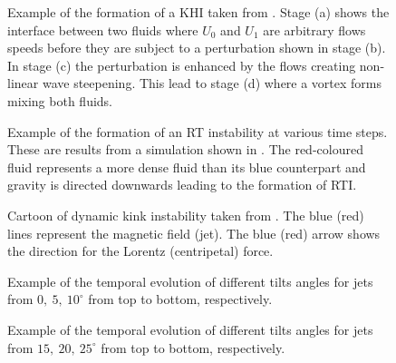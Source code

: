 \documentclass[12pt]{ociamthesis}
\begin{document}
\begin{figure}
\captionsetup[subfigure]{labelformat=empty}
\centering
{}
\caption{Example of the formation of a KHI taken from \cite{Barbulescu2018SoPh29386B}. Stage (a) shows the interface between two fluids where $U_0$ and $U_1$ are arbitrary flows speeds before they are subject to a perturbation shown in stage (b). In stage (c) the perturbation is enhanced by the flows creating non-linear wave steepening. This lead to stage (d) where a vortex forms mixing both fluids.}
\label{KHI_example}
\end{figure}
\begin{figure}
\captionsetup[subfigure]{labelformat=empty}
\centering
{}
\caption{Example of the formation of an RT instability at various time steps. These are results from a simulation shown in \cite{Liang2019PhFl31k2104L}. The red-coloured fluid represents a more dense fluid than its blue counterpart and gravity is directed downwards leading to the formation of RTI.}
\label{RT_example}
\end{figure}
\begin{figure}
\captionsetup[subfigure]{labelformat=empty}
\centering
{}
\caption{Cartoon of dynamic kink instability taken from \cite{Zaqarashvili2020ApJ893L46Z}. The blue (red) lines represent the magnetic field (jet). The blue (red) arrow shows the direction for the Lorentz (centripetal) force.}
\label{DKI_example}
\end{figure}
\begin{figure}
\captionsetup[subfigure]{labelformat=empty}
\centering
{}
\caption{Example of the temporal evolution of different tilts angles for jets from $0,~5,~10^{\circ}$ from top to bottom, respectively.}
\label{tj_morph_1}
\end{figure}
\begin{figure}
\captionsetup[subfigure]{labelformat=empty}
\centering
{}
\caption{Example of the temporal evolution of different tilts angles for jets from $15,~20,~25^{\circ}$ from top to bottom, respectively.}
\label{tj_morph_2}
\end{figure}
\end{document}
